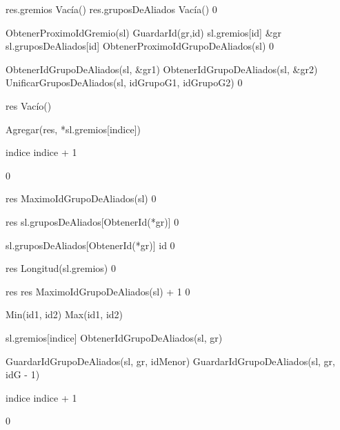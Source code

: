 {
	\state res.gremios \asig Vacía()
	\state res.gruposDeAliados \asig Vacía()
}
{0}

{
	\state {} \asig ObtenerProximoIdGremio(sl)
	\state
	\state GuardarId(gr,id)
	\state sl.gremios[id] \asig \&gr
	\state sl.gruposDeAliados[id] \asig ObtenerProximoIdGrupoDeAliados(sl)
}
{0}

{
	\state {} \asig ObtenerIdGrupoDeAliados(sl, \&gr1)
	\state {} \asig ObtenerIdGrupoDeAliados(sl, \&gr2)
	\state 
	\state UnificarGruposDeAliados(sl, idGrupoG1, idGrupoG2)
}
{0}

{
	\state res \asig Vacío()

	\state
	\state {} 
		\state

		\state Agregar(res, *sl.gremios[indice])

		\state
		\state indice \asig indice + 1
	\endwhile
}
{0}

{
	\state res \asig MaximoIdGrupoDeAliados(sl)
}
{0}

{
	\state res \asig sl.gruposDeAliados[ObtenerId(*gr)]
}
{0}

{
	\state sl.gruposDeAliados[ObtenerId(*gr)] \asig id
}
{0}

{
	\state res \asig Longitud(sl.gremios)
}
{0}

{
		\state res 
	\Else
		\state res \asig MaximoIdGrupoDeAliados(sl) + 1
	\endif
}
{0}

{
	\state {} \asig Min(id1, id2)
	\state {} \asig Max(id1, id2)
	\state

	\state {} 

		\state

		\state {} \asig sl.gremios[indice]
		\state {} \asig ObtenerIdGrupoDeAliados(sl, gr)
		\state

			\state GuardarIdGrupoDeAliados(sl, gr, idMenor)
		\Else {}
				\state GuardarIdGrupoDeAliados(sl, gr, idG - 1)
			\endif
		\endif
		\state

		\state indice \asig indice + 1
	\endwhile
}
{0}

